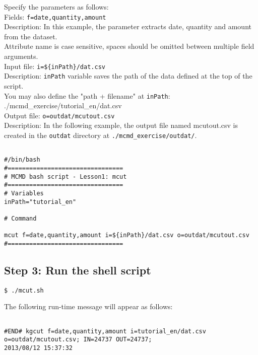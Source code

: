 {\setlength{\parindent}{0cm}

Specify the parameters as follows: \\

Fields: 		\verb|f=date,quantity,amount| \\
Description: In this example, the parameter extracts date, quantity and amount from the dataset. \\
Attribute name is case sensitive, spaces should be omitted between multiple field arguments.\\

Input file: 		\verb|i=${inPath}/dat.csv| \\
Description: \verb|inPath| variable saves the path of the data defined at the top of the script. \\
You may also define the "path + filename" at \verb|inPath|: ./mcmd\_exercise/tutorial\_en/dat.csv\\

Output file: 	\verb|o=outdat/mcutout.csv| \\
Description: In the following example, the output file named mcutout.csv is created in the \verb|outdat| directory at \verb|./mcmd_exercise/outdat/|. 
}

\begin{verbatim}

#/bin/bash
#================================
# MCMD bash script - Lesson1: mcut
#================================
# Variables
inPath="tutorial_en"

# Command 

mcut f=date,quantity,amount i=${inPath}/dat.csv o=outdat/mcutout.csv
#================================

\end{verbatim}

\subsection{Step 3: Run the shell script }

\begin{verbatim}
$ ./mcut.sh
\end{verbatim} 

\noindent The following run-time message will appear as follows: 
\begin{verbatim}

#END# kgcut f=date,quantity,amount i=tutorial_en/dat.csv o=outdat/mcutout.csv; IN=24737 OUT=24737; 
2013/08/12 15:37:32

\end{verbatim}

